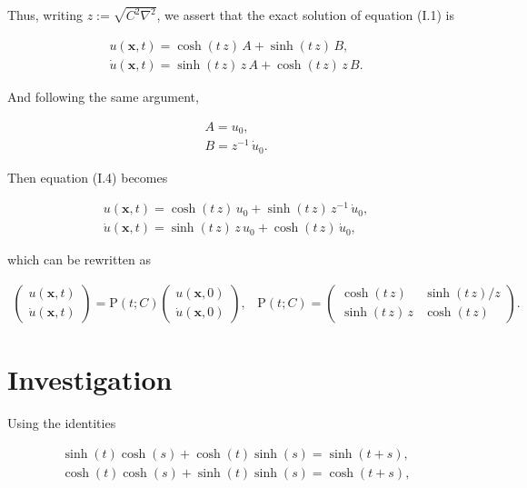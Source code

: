 \documentclass[amsmath,amssymb,floatfix]{revtex4}
\numberwithin{equation}{section}
\newcommand{\twomat}[4]{ \left( \begin{array}{cc} #1 & #2 \\ #3 & #4  \end{array} \right) }
\newcommand{\twovec}[2]{ \left( \begin{array}{c} #1  \\ #2   \end{array} \right) }
\begin{document}
\noindent
Thus, writing $z := \sqrt{C^2\nabla^2}$, we assert that the exact solution of equation (I.1) is 

\begin{eqnarray}
	 u(\mathbf{x},t) = \cosh{( t \, z )} \,  A + \sinh{(t \, z)} \, B, \nonumber \\	 
	 \dot{u}(\mathbf{x},t) = \sinh{(t \, z )} \, z\, A + \cosh{(t \, z)} \,z\, B.
\end{eqnarray}

\noindent
And following the same argument,

\begin{eqnarray}
	A = u_0, \nonumber \\	 
	B = z^{-1} \, 	\dot{u}_0.	
\end{eqnarray}

\noindent
Then equation (I.4) becomes

\begin{eqnarray}
	 u(\mathbf{x},t) = \cosh{( t \, z )} \,  u_0 + \sinh{(t \, z)} \, z^{-1} \, 	\dot{u}_0, \nonumber \\	 
	 \dot{u}(\mathbf{x},t) = \sinh{(t \, z )} \, z\, u_0 + \cosh{(t \, z)} \, \dot{u}_0,
\end{eqnarray}

\noindent
which can be rewritten as

\begin{eqnarray}
	 \twovec{u(\mathbf{x},t)}{\dot{u}(\mathbf{x},t)} = \textrm{P}(t; C)  \twovec{u(\mathbf{x},0)}{\dot{u}(\mathbf{x},0)},	 \; \; \; 
	 \textrm{P}(t; C) = \twomat{\cosh{( t \, z )}}{\sinh{(t \, z )} / z}{\sinh{(t \, z )} \, z}{\cosh{( t \, z )}}.
\end{eqnarray}

\section{\label{sec:level2}Investigation\protect}

\noindent
Using the identities 

\begin{eqnarray}
	\sinh{(t)}\cosh{(s)}+\cosh{(t)}\sinh{(s)} = \sinh{(t+s)} , \nonumber \\
	\cosh{(t)}\cosh{(s)}+\sinh{(t)}\sinh{(s)} = \cosh{(t+s)} , \nonumber \\
\end{eqnarray}
\end{document}
